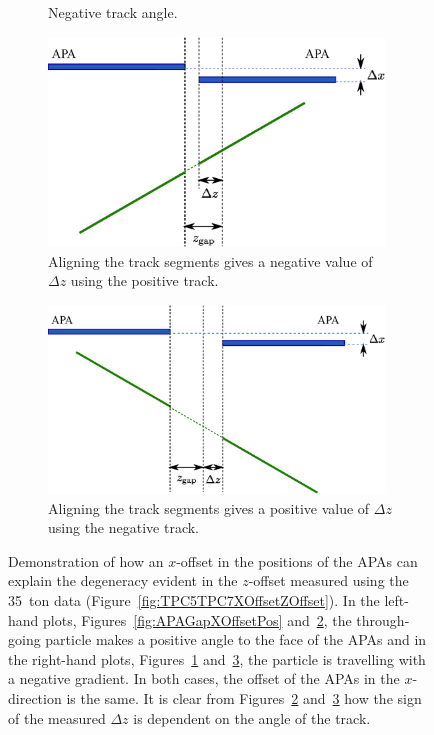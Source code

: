\begin{figure}
\begin{subfigure}[t]{0.48\linewidth}
    \caption{Negative track angle.}
    \label{fig:APAGapXOffsetNeg}
  \end{subfigure}
  \vfill
  \begin{subfigure}[t]{0.48\linewidth}
    \centering
    \includegraphics[width=0.98\textwidth]{apa_gap_xoffset_pos_fix.eps}
    \caption{Aligning the track segments gives a negative value of $\Delta z$ using the positive track.}
    \label{fig:APAGapXOffsetPosFix}
  \end{subfigure}
  \hfill
  \begin{subfigure}[t]{0.48\linewidth}
    \centering
    \includegraphics[width=0.98\textwidth]{apa_gap_xoffset_neg_fix.eps}
    \caption{Aligning the track segments gives a positive value of $\Delta z$ using the negative track.}
    \label{fig:APAGapXOffsetNegFix}
  \end{subfigure}
  \caption{Demonstration of how an $x$-offset in the positions of the APAs can explain the degeneracy evident in the $z$-offset measured using the 35~ton data (Figure~\ref{fig:TPC5TPC7XOffsetZOffset}).  In the left-hand plots, Figures~\ref{fig:APAGapXOffsetPos} and~\ref{fig:APAGapXOffsetPosFix}, the through-going particle makes a positive angle to the face of the APAs and in the right-hand plots, Figures~\ref{fig:APAGapXOffsetNeg} and~\ref{fig:APAGapXOffsetNegFix}, the particle is travelling with a negative gradient.  In both cases, the offset of the APAs in the $x$-direction is the same.  It is clear from Figures~\ref{fig:APAGapXOffsetPosFix} and~\ref{fig:APAGapXOffsetNegFix} how the sign of the measured $\Delta z$ is dependent on the angle of the track.}
  \label{fig:APAGapXOffset}
\end{figure}

